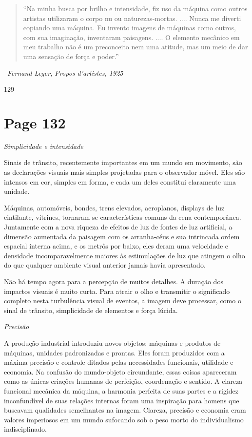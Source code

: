 \documentclass[a4paper]{article}
\begin{document}
\begin{quote}
``Na minha busca por brilho e intensidade, fiz uso da máquina como outros artistas utilizaram o corpo nu ou naturezas-mortas. .... Nunca me diverti copiando uma máquina. Eu invento imagens de máquinas como outros, com sua imaginação, inventaram paisagens. .... O elemento mecânico em meu trabalho não é um preconceito nem uma atitude, mas um meio de dar uma sensação de força e poder.''
\end{quote}

\textbullet\ \textit{Fernand Leger, Propos d'artistes, 1925}

\vspace*{\fill}
\begin{flushright}
129
\end{flushright}

\newpage
\section*{Page 132}

\large\textit{Simplicidade e intensidade}

Sinais de trânsito, recentemente importantes em um mundo em movimento, são as declarações visuais mais simples projetadas para o observador móvel. Eles são intensos em cor, simples em forma, e cada um deles constitui claramente uma unidade.

Máquinas, automóveis, bondes, trens elevados, aeroplanos, displays de luz cintilante, vitrines, tornaram-se características comuns da cena contemporânea. Juntamente com a nova riqueza de efeitos de luz de fontes de luz artificial, a dimensão aumentada da paisagem com os arranha-céus e sua intrincada ordem espacial interna acima, e os metrôs por baixo, eles deram uma velocidade e densidade incomparavelmente maiores às estimulações de luz que atingem o olho do que qualquer ambiente visual anterior jamais havia apresentado.

Não há tempo agora para a percepção de muitos detalhes. A duração dos impactos visuais é muito curta. Para atrair o olho e transmitir o significado completo nesta turbulência visual de eventos, a imagem deve processar, como o sinal de trânsito, simplicidade de elementos e força lúcida.

\large\textit{Precisão}

A produção industrial introduziu novos objetos: máquinas e produtos de máquinas, unidades padronizadas e prontas. Eles foram produzidos com a máxima precisão e controle ditados pelas necessidades funcionais, utilidade e economia. Na confusão do mundo-objeto circundante, essas coisas apareceram como as únicas criações humanas de perfeição, coordenação e sentido. A clareza funcional mecânica da máquina, a harmonia perfeita de suas partes e a rigidez inconfundível de suas relações internas foram uma inspiração para homens que buscavam qualidades semelhantes na imagem. Clareza, precisão e economia eram valores imperiosos em um mundo sufocando sob o peso morto do individualismo indisciplinado.
\end{document}

